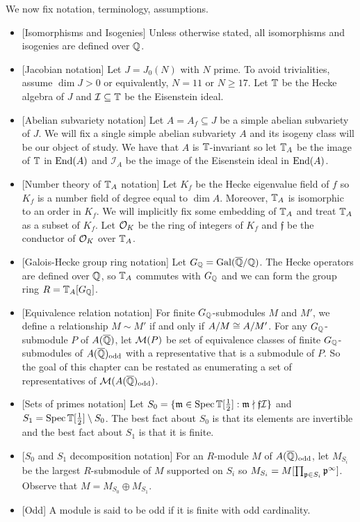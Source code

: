 \documentclass{article}
\newcommand{\f}{\mathfrak{f}}
\newcommand{\I}{\mathcal{I}}
\newcommand{\odd}{\mathrm{odd}}
\begin{document}
We now fix notation, terminology, assumptions.
\begin{itemize}
    \item{} [Isomorphisms and Isogenies]
        Unless otherwise stated, all isomorphisms and isogenies are defined
        over $\mathbb{Q}$.
    \item{} [Jacobian notation]
        Let $J = J_0(N)$ with $N$ prime. To avoid trivialities, assume $\dim
        J>0$ or equivalently, $N=11$ or $N\geq 17$. Let $\mathbb{T}$ be the Hecke
        algebra of $J$ and $\I\subseteq \TT$ be the Eisenstein ideal.
    \item{} [Abelian subvariety notation]
        Let $A=A_f\subseteq J$ be a simple abelian subvariety of $J$. We will
        fix a single simple abelian subvariety $A$ and its isogeny class will
        be our object of study. We have that $A$ is $\mathbb{T}$-invariant so let
        $\mathbb{T}_A$ be the image of $\mathbb{T}$ in $\operatorname{End}(A)$ and $\I_A$ be the image of
        the Eisenstein ideal in $\operatorname{End}(A)$. 
    \item{} [Number theory of $\mathbb{T}_A$ notation] 
        Let $K_f$ be the Hecke eigenvalue field of $f$ so $K_f$ is a number
        field of degree equal to $\dim A$. Moreover, $\mathbb{T}_A$ is isomorphic to
        an order in $K_f$. We will implicitly fix some embedding of $\mathbb{T}_A$ and
        treat $\mathbb{T}_A$ as a subset of $K_f$. Let $\mathcal{O}_K$ be the ring of integers
        of $K_f$ and $\f$ be the conductor of $\mathcal{O}_K$ over $\mathbb{T}_A$.
    \item{} [Galois-Hecke group ring notation]
        Let $G_{\mathbb{Q}}=\operatorname{Gal}(\overline{\mathbb{Q}}/\mathbb{Q})$. The Hecke operators are defined over
        $\mathbb{Q}$, so $\mathbb{T}_A$ commutes with $G_{\mathbb{Q}}$ and we can form the group ring
        $R=\mathbb{T}_A[G_{\mathbb{Q}}]$.
    \item{} [Equivalence relation notation]
        For finite $G_{\mathbb{Q}}$-submodules $M$ and $M'$, we define a relationship
        $M\sim M'$ if and only if $A/M \cong A/M'$. For any $G_{\mathbb{Q}}$-submodule
        $P$ of $A(\overline{\mathbb{Q}})$, let $\mathcal{M}(P)$ be set of equivalence classes of finite
        $G_{\mathbb{Q}}$-submodules of $A(\QQbar)_\odd$ with a representative that is a
        submodule of $P$. So the goal of this chapter can be restated as
        enumerating a set of representatives of $\M(A(\QQbar)_\odd)$.
    \item{} [Sets of primes notation]
        Let $S_0=\{\mathfrak{m}\in \operatorname{Spec}\mathbb{T}[\frac 12]: \mathfrak{m} \nmid
        \mathfrak{f}\mathcal{I}\}$ and $S_1 = \operatorname{Spec}\mathbb{T}[\frac 12]\setminus S_0$.
        The best fact about $S_0$ is that its elements are invertible and the
        best fact about $S_1$ is that it is finite.
    \item{} [$S_0$ and $S_1$ decomposition notation]
        For an $R$-module $M$ of $A(\QQbar)_\odd$, let $M_{S_i}$ be the largest
        $R$-submodule of $M$ supported on $S_i$ so $M_{S_i}=M[\prod_{\mathfrak{p}\in S_i}
        \mathfrak{p}^\infty]$. Observe that $M = M_{S_0}\oplus M_{S_1}$.
    \item{} [Odd]
        A module is said to be odd if it is finite with odd cardinality.
\end{itemize}
\end{document}
